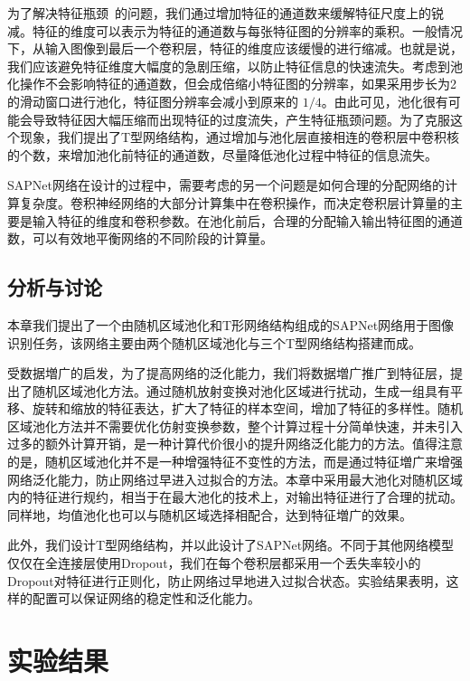 为了解决特征瓶颈~\cite{szegedy2015rethinking}的问题，我们通过增加特征的通道数来缓解特征尺度上的锐减。特征的维度可以表示为特征的通道数与每张特征图的分辨率的乘积。一般情况下，从输入图像到最后一个卷积层，特征的维度应该缓慢的进行缩减。也就是说，我们应该避免特征维度大幅度的急剧压缩，以防止特征信息的快速流失。考虑到池化操作不会影响特征的通道数，但会成倍缩小特征图的分辨率，如果采用步长为2的滑动窗口进行池化，特征图分辨率会减小到原来的 $1/4$。由此可见，池化很有可能会导致特征因大幅压缩而出现特征的过度流失，产生特征瓶颈问题。为了克服这个现象，我们提出了T型网络结构，通过增加与池化层直接相连的卷积层中卷积核的个数，来增加池化前特征的通道数，尽量降低池化过程中特征的信息流失。

SAPNet网络在设计的过程中，需要考虑的另一个问题是如何合理的分配网络的计算复杂度。卷积神经网络的大部分计算集中在卷积操作，而决定卷积层计算量的主要是输入特征的维度和卷积参数。在池化前后，合理的分配输入输出特征图的通道数，可以有效地平衡网络的不同阶段的计算量。

\subsection{分析与讨论}
\label{sec:sap:model:discuss}

本章我们提出了一个由随机区域池化和T形网络结构组成的SAPNet网络用于图像识别任务，该网络主要由两个随机区域池化与三个T型网络结构搭建而成。

受数据増广的启发，为了提高网络的泛化能力，我们将数据増广推广到特征层，提出了随机区域池化方法。通过随机放射变换对池化区域进行扰动，生成一组具有平移、旋转和缩放的特征表达，扩大了特征的样本空间，增加了特征的多样性。随机区域池化方法并不需要优化仿射变换参数，整个计算过程十分简单快速，并未引入过多的额外计算开销，是一种计算代价很小的提升网络泛化能力的方法。值得注意的是，随机区域池化并不是一种增强特征不变性的方法，而是通过特征増广来增强网络泛化能力，防止网络过早进入过拟合的方法。本章中采用最大池化对随机区域内的特征进行规约，相当于在最大池化的技术上，对输出特征进行了合理的扰动。同样地，均值池化也可以与随机区域选择相配合，达到特征増广的效果。

此外，我们设计T型网络结构，并以此设计了SAPNet网络。不同于其他网络模型仅仅在全连接层使用Dropout，我们在每个卷积层都采用一个丢失率较小的Dropout对特征进行正则化，防止网络过早地进入过拟合状态。实验结果表明，这样的配置可以保证网络的稳定性和泛化能力。


\section{实验结果}
\label{sec:sap:experiment}

